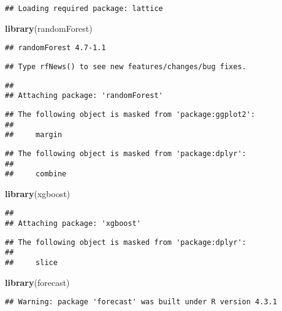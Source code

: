 \documentclass[
]{article}
\newenvironment{Shaded}{\begin{snugshade}}{\end{snugshade}}
\newcommand{\FunctionTok}[1]{\textcolor[rgb]{0.13,0.29,0.53}{\textbf{#1}}}
\newcommand{\NormalTok}[1]{#1}
\begin{document}
\begin{verbatim}
## Loading required package: lattice
\end{verbatim}

\begin{Shaded}
\begin{Highlighting}[]
\FunctionTok{library}\NormalTok{(randomForest)}
\end{Highlighting}
\end{Shaded}

\begin{verbatim}
## randomForest 4.7-1.1
\end{verbatim}

\begin{verbatim}
## Type rfNews() to see new features/changes/bug fixes.
\end{verbatim}

\begin{verbatim}
## 
## Attaching package: 'randomForest'
\end{verbatim}

\begin{verbatim}
## The following object is masked from 'package:ggplot2':
## 
##     margin
\end{verbatim}

\begin{verbatim}
## The following object is masked from 'package:dplyr':
## 
##     combine
\end{verbatim}

\begin{Shaded}
\begin{Highlighting}[]
\FunctionTok{library}\NormalTok{(xgboost)}
\end{Highlighting}
\end{Shaded}

\begin{verbatim}
## 
## Attaching package: 'xgboost'
\end{verbatim}

\begin{verbatim}
## The following object is masked from 'package:dplyr':
## 
##     slice
\end{verbatim}

\begin{Shaded}
\begin{Highlighting}[]
\FunctionTok{library}\NormalTok{(forecast)}
\end{Highlighting}
\end{Shaded}

\begin{verbatim}
## Warning: package 'forecast' was built under R version 4.3.1
\end{verbatim}
\end{document}
